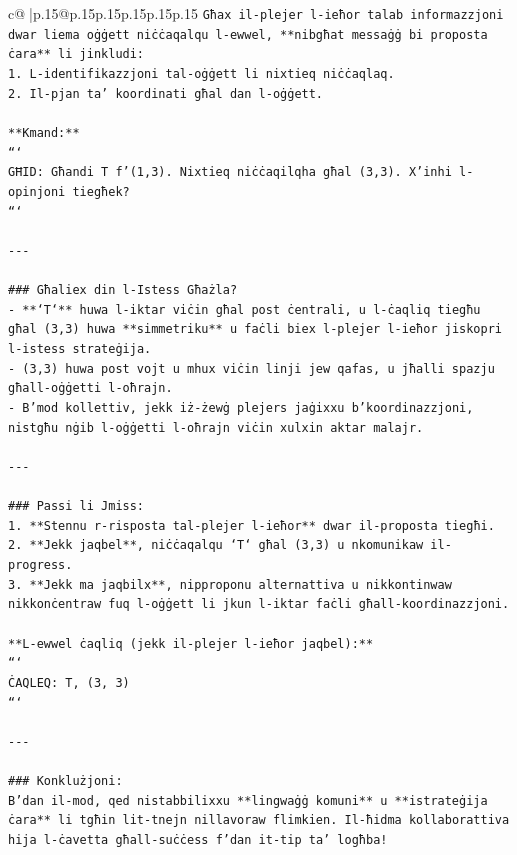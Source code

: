 \documentclass{article}
\begin{document}
{\begin{supertabular}{c@{$\;$}|p{.15\linewidth}@{}p{.15\linewidth}p{.15\linewidth}p{.15\linewidth}p{.15\linewidth}p{.15\linewidth}}
{{{\texttt{Għax il{-}plejer l{-}ieħor talab informazzjoni dwar liema oġġett niċċaqalqu l{-}ewwel, **nibgħat messaġġ bi proposta ċara** li jinkludi:} \\
\texttt{1. L{-}identifikazzjoni tal{-}oġġett li nixtieq niċċaqlaq.} \\
\texttt{2. Il{-}pjan ta' koordinati għal dan l{-}oġġett.} \\
\\ 
\texttt{**Kmand:**} \\
\texttt{```} \\
\texttt{GĦID: Għandi T f'(1,3). Nixtieq niċċaqilqha għal (3,3). X'inhi l{-}opinjoni tiegħek?} \\
\texttt{```} \\
\\ 
\texttt{{-}{-}{-}} \\
\\ 
\texttt{\#\#\# Għaliex din l{-}Istess Għażla?} \\
\texttt{{-} **`T`** huwa l{-}iktar viċin għal post ċentrali, u l{-}ċaqliq tiegħu għal (3,3) huwa **simmetriku** u faċli biex l{-}plejer l{-}ieħor jiskopri l{-}istess strateġija.} \\
\texttt{{-} (3,3) huwa post vojt u mhux viċin linji jew qafas, u jħalli spazju għall{-}oġġetti l{-}oħrajn.} \\
\texttt{{-} B'mod kollettiv, jekk iż{-}żewġ plejers jaġixxu b'koordinazzjoni, nistgħu nġib l{-}oġġetti l{-}oħrajn viċin xulxin aktar malajr.} \\
\\ 
\texttt{{-}{-}{-}} \\
\\ 
\texttt{\#\#\# Passi li Jmiss:} \\
\texttt{1. **Stennu r{-}risposta tal{-}plejer l{-}ieħor** dwar il{-}proposta tiegħi.} \\
\texttt{2. **Jekk jaqbel**, niċċaqalqu `T` għal (3,3) u nkomunikaw il{-}progress.} \\
\texttt{3. **Jekk ma jaqbilx**, nipproponu alternattiva u nikkontinwaw nikkonċentraw fuq l{-}oġġett li jkun l{-}iktar faċli għall{-}koordinazzjoni.} \\
\\ 
\texttt{**L{-}ewwel ċaqliq (jekk il{-}plejer l{-}ieħor jaqbel):**} \\
\texttt{```} \\
\texttt{ĊAQLEQ: T, (3, 3)} \\
\texttt{```} \\
\\ 
\texttt{{-}{-}{-}} \\
\\ 
\texttt{\#\#\# Konklużjoni:} \\
\texttt{B'dan il{-}mod, qed nistabbilixxu **lingwaġġ komuni** u **istrateġija ċara** li tgħin lit{-}tnejn nillavoraw flimkien. Il{-}ħidma kollaborattiva hija l{-}ċavetta għall{-}suċċess f'dan it{-}tip ta' logħba!} \\
            }
        }
    }
     \\ \\


\end{supertabular}}
\end{document}

